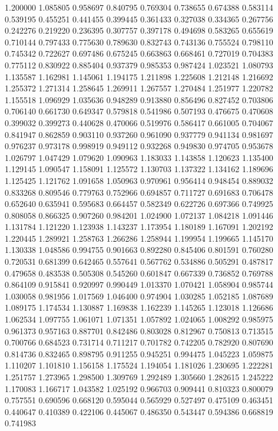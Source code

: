 1.200000
1.085805
0.958697
0.840795
0.769304
0.738655
0.674388
0.583114
0.539195
0.455251
0.441455
0.399445
0.361433
0.327038
0.334365
0.267756
0.242276
0.219220
0.236395
0.307757
0.397178
0.494698
0.583265
0.655619
0.710144
0.797433
0.775630
0.789630
0.832743
0.743136
0.755524
0.798110
0.745342
0.722627
0.697486
0.675245
0.663863
0.668461
0.727019
0.704383
0.775112
0.830922
0.885404
0.937379
0.985353
0.987424
1.023521
1.080793
1.135587
1.162981
1.145061
1.194175
1.211898
1.225608
1.212148
1.216692
1.255372
1.271314
1.258645
1.269911
1.267557
1.270484
1.251977
1.220782
1.155518
1.096929
1.035636
0.948289
0.913880
0.856496
0.827452
0.703806
0.706140
0.661730
0.649347
0.579818
0.541986
0.507193
0.476675
0.470608
0.399032
0.399273
0.440628
0.470066
0.519976
0.586417
0.661005
0.704067
0.841947
0.862859
0.903110
0.937260
0.961090
0.937779
0.941134
0.981697
0.976237
0.973178
0.998919
0.949112
0.932268
0.949830
0.974705
0.953678
1.026797
1.047429
1.079620
1.090963
1.183033
1.143858
1.120623
1.135400
1.129145
1.090547
1.158091
1.125572
1.130703
1.137322
1.134162
1.189696
1.125425
1.121762
1.091658
1.050963
0.970961
0.956414
0.948454
0.889032
0.833268
0.809546
0.779763
0.752966
0.694857
0.711727
0.691683
0.706478
0.652640
0.635941
0.595683
0.664457
0.582349
0.622726
0.697366
0.749925
0.808058
0.866325
0.907260
0.984201
1.024900
1.072137
1.084218
1.091446
1.131784
1.121220
1.123938
1.143237
1.173954
1.180189
1.167091
1.202192
1.220445
1.289921
1.258763
1.266286
1.258944
1.199954
1.199665
1.145170
1.130338
1.048586
0.994755
0.901663
0.892280
0.845406
0.801591
0.760280
0.720531
0.681399
0.642465
0.557641
0.567762
0.534886
0.505291
0.487817
0.479658
0.483538
0.505308
0.545260
0.601847
0.667339
0.736852
0.769788
0.864109
0.915841
0.920997
0.990449
1.013370
1.070421
1.058904
0.985744
1.030058
0.981956
1.017569
1.046400
0.974904
1.030285
1.052185
1.087689
1.089175
1.174534
1.130887
1.169838
1.162239
1.145265
1.123018
1.126686
1.062534
1.097755
1.061071
1.071351
1.057892
1.024065
1.008292
0.985975
0.961373
0.957163
0.887701
0.842486
0.803028
0.812967
0.750813
0.713515
0.700766
0.684523
0.731714
0.711217
0.701782
0.742205
0.782920
0.807690
0.814736
0.832465
0.898795
0.911255
0.945251
0.994475
1.045223
1.059875
1.110207
1.101810
1.156158
1.175524
1.194054
1.181026
1.230695
1.222281
1.251757
1.273965
1.298500
1.309769
1.292489
1.305660
1.282615
1.245222
1.170083
1.166717
1.043582
1.025192
0.966703
0.909441
0.810323
0.800079
0.757551
0.690596
0.668120
0.595044
0.565929
0.527497
0.475109
0.463451
0.440647
0.410389
0.422106
0.445067
0.486350
0.543447
0.594386
0.668819
0.741983
